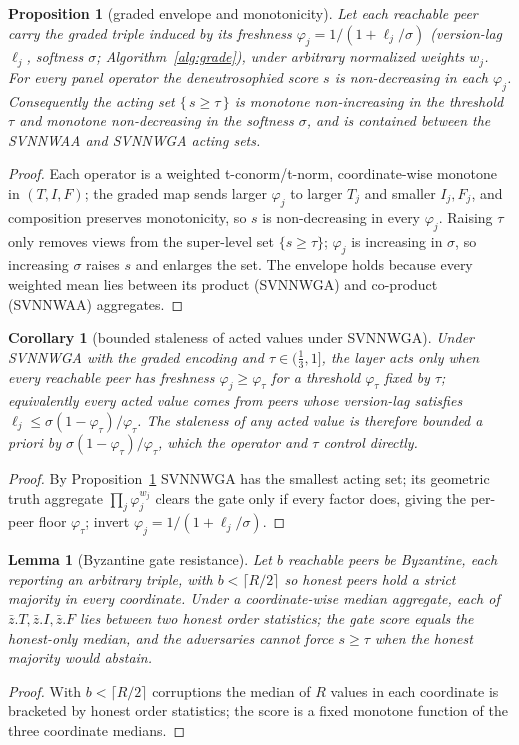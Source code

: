 \documentclass[fleqn,10pt]{wlscirep}
\newtheorem{proposition}{Proposition}
\newtheorem{lemma}{Lemma}
\newtheorem{corollary}{Corollary}
\begin{document}
\begin{proposition}[graded envelope and monotonicity]\label{prop:graded}
Let each reachable peer carry the graded triple induced by its freshness $\varphi_j=1/(1+\ell_j/\sigma)$
(version-lag $\ell_j$, softness $\sigma$; Algorithm~\ref{alg:grade}), under arbitrary normalized weights
$w_j$. For every panel operator the deneutrosophied score $s$ is non-decreasing in each $\varphi_j$.
Consequently the acting set $\{\,s\ge\tau\,\}$ is monotone non-increasing in the threshold $\tau$ and
monotone non-decreasing in the softness $\sigma$, and is contained between the SVNNWAA and SVNNWGA acting
sets.
\end{proposition}
\begin{proof}
Each operator is a weighted t-conorm/t-norm, coordinate-wise monotone in $(T,I,F)$; the graded map sends
larger $\varphi_j$ to larger $T_j$ and smaller $I_j,F_j$, and composition preserves monotonicity, so $s$
is non-decreasing in every $\varphi_j$. Raising $\tau$ only removes views from the super-level set
$\{s\ge\tau\}$; $\varphi_j$ is increasing in $\sigma$, so increasing $\sigma$ raises $s$ and enlarges the
set. The envelope holds because every weighted mean lies between its product (SVNNWGA) and co-product
(SVNNWAA) aggregates.
\end{proof}

\begin{corollary}[bounded staleness of acted values under SVNNWGA]\label{cor:lag}
Under SVNNWGA with the graded encoding and $\tau\in(\tfrac13,1]$, the layer acts only when every reachable
peer has freshness $\varphi_j\ge\varphi_\tau$ for a threshold $\varphi_\tau$ fixed by $\tau$; equivalently
every acted value comes from peers whose version-lag satisfies $\ell_j\le\sigma(1-\varphi_\tau)/\varphi_\tau$.
The staleness of any acted value is therefore bounded \emph{a priori} by
$\sigma(1-\varphi_\tau)/\varphi_\tau$, which the operator and $\tau$ control directly.
\end{corollary}
\begin{proof}
By Proposition~\ref{prop:graded} SVNNWGA has the smallest acting set; its geometric truth aggregate
$\prod_j\varphi_j^{w_j}$ clears the gate only if every factor does, giving the per-peer floor
$\varphi_\tau$; invert $\varphi_j=1/(1+\ell_j/\sigma)$.
\end{proof}

\begin{lemma}[Byzantine gate resistance]\label{lem:byz}
Let $b$ reachable peers be Byzantine, each reporting an arbitrary triple, with $b<\lceil R/2\rceil$ so
honest peers hold a strict majority \emph{in every coordinate}. Under a coordinate-wise median aggregate,
each of $\bar z.T,\bar z.I,\bar z.F$ lies between two honest order statistics; the gate score equals the
honest-only median, and the adversaries cannot force $s\ge\tau$ when the honest majority would abstain.
\end{lemma}
\begin{proof}
With $b<\lceil R/2\rceil$ corruptions the median of $R$ values in each coordinate is bracketed by honest
order statistics; the score is a fixed monotone function of the three coordinate medians.
\end{proof}
\end{document}
